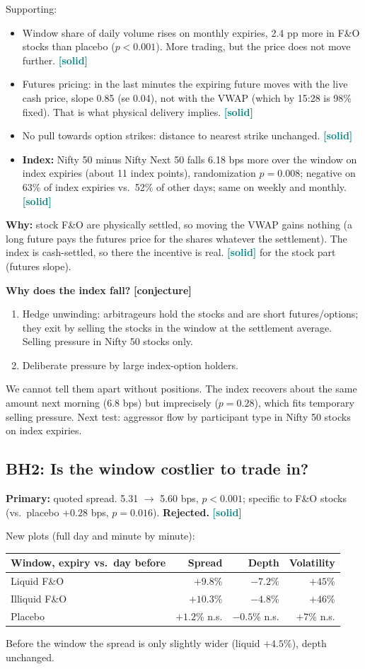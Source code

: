 \documentclass[11pt]{article}
\newcommand{\solid}{\textcolor{teal}{\textbf{[solid]}}}
\newcommand{\guess}{\textcolor{orange!80!black}{\textbf{[conjecture]}}}
\begin{document}
Supporting:
\begin{itemize}
  \item Window share of daily volume rises on monthly expiries, 2.4 pp more in F\&O stocks than
  placebo ($p<0.001$). More trading, but the price does not move further. \solid
  \item Futures pricing: in the last minutes the expiring future moves with the live cash price,
  slope 0.85 (se 0.04), not with the VWAP (which by 15:28 is 98\% fixed). That is what physical
  delivery implies. \solid
  \item No pull towards option strikes: distance to nearest strike unchanged. \solid
  \item \textbf{Index:} Nifty 50 minus Nifty Next 50 falls 6.18 bps more over the window on
  index expiries (about 11 index points), randomization $p=0.008$; negative on 63\% of index
  expiries vs.\ 52\% of other days; same on weekly and monthly. \solid
\end{itemize}
\textbf{Why:} stock F\&O are physically settled, so moving the VWAP gains nothing (a long future
pays the futures price for the shares whatever the settlement). The index is cash-settled, so
there the incentive is real. \solid{} for the stock part (futures slope).

\textbf{Why does the index fall?} \guess
\begin{enumerate}
  \item Hedge unwinding: arbitrageurs hold the stocks and are short futures/options; they exit
  by selling the stocks in the window at the settlement average. Selling pressure in Nifty 50
  stocks only.
  \item Deliberate pressure by large index-option holders.
\end{enumerate}
We cannot tell them apart without positions. The index recovers about the same amount next
morning (6.8 bps) but imprecisely ($p=0.28$), which fits temporary selling pressure. Next test:
aggressor flow by participant type in Nifty 50 stocks on index expiries.

\subsection*{BH2: Is the window costlier to trade in?}
\textbf{Primary:} quoted spread. 5.31 $\to$ 5.60 bps, $p<0.001$; specific to F\&O stocks (vs.\
placebo $+0.28$ bps, $p=0.016$). \textbf{Rejected.} \solid

New plots (full day and minute by minute):
\begin{center}
\small
\begin{tabular}{lrrr}
\toprule
Window, expiry vs.\ day before & Spread & Depth & Volatility \\
\midrule
Liquid F\&O & $+9.8$\% & $-7.2$\% & $+45$\% \\
Illiquid F\&O & $+10.3$\% & $-4.8$\% & $+46$\% \\
Placebo & $+1.2$\% n.s. & $-0.5$\% n.s. & $+7$\% n.s. \\
\bottomrule
\end{tabular}
\end{center}
Before the window the spread is only slightly wider (liquid $+4.5$\%), depth unchanged.
\end{document}
